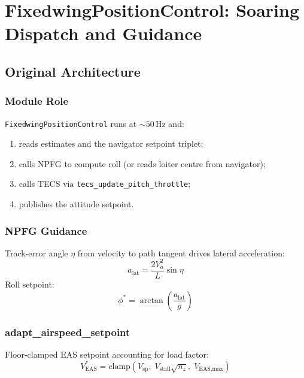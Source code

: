 \documentclass[12pt,a4paper]{report}
\begin{document}
\chapter{FixedwingPositionControl: Soaring Dispatch and Guidance}

\section{Original Architecture}

\subsection{Module Role}

\texttt{FixedwingPositionControl} runs at $\sim 50$\,Hz and:
\begin{enumerate}
  \item reads estimates and the navigator setpoint triplet;
  \item calls NPFG to compute roll (or reads loiter centre from navigator);
  \item calls TECS via \texttt{tecs\_update\_pitch\_throttle};
  \item publishes the attitude setpoint.
\end{enumerate}

\subsection{NPFG Guidance}

Track-error angle $\eta$ from velocity to path tangent drives lateral
acceleration:
\begin{equation}
  a_{\text{lat}} = \frac{2V_a^2}{L}\sin\eta
\end{equation}
Roll setpoint:
\begin{equation}
  \phi^* = \arctan\!\left(\frac{a_{\text{lat}}}{g}\right)
\end{equation}

\subsection{adapt\_airspeed\_setpoint}

Floor-clamped EAS setpoint accounting for load factor:
\begin{equation}
  V_{\text{EAS}}^* = \text{clamp}\!\left(
    V_{\text{sp}},\;
    V_{\text{stall}}\sqrt{n_z},\;
    V_{\text{EAS,max}}
  \right)
\end{equation}
\end{document}
